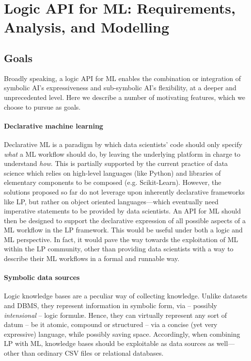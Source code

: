 \documentclass[12pt,a4paper,openright,twoside]{book}
\begin{document}
\section{Logic API for ML: Requirements, Analysis, and Modelling}
\label{sec:requirements}

\subsection{Goals}\label{ssec:goals}

Broadly speaking, a logic API for ML enables the combination or integration of symbolic AI's expressiveness and sub-symbolic AI's flexibility, at a deeper and unprecedented level.
%
Here we describe a number of motivating features, which we choose to pursue as goals.


\paragraph{Declarative machine learning}

Declarative ML is a paradigm by which data scientists' code should only specify \emph{what} a ML workflow should do, by leaving the underlying platform in charge to understand \emph{how}.
%
This is partially supported by the current practice of data science which relies on high-level languages (like Python) and libraries of elementary components to be composed (e.g. Scikit-Learn).
%
However, the solutions proposed so far do not leverage upon inherently declarative frameworks like LP, but rather on object oriented languages---which eventually need imperative statements to be provided by data scientists.
%
An API for ML should then be designed to support the declarative expression of all possible aspects of a ML workflow in the LP framework.
%
This would be useful under both a logic and ML perspective.
%
In fact, it would pave the way towards the exploitation of ML within the LP community, other than providing data scientists with a way to describe their ML workflows in a formal and runnable way.


\paragraph{Symbolic data sources}

Logic knowledge bases are a peculiar way of collecting knowledge.
%
Unlike datasets and DBMS, they represent information in symbolic form, via -- possibly \emph{intensional} -- logic formul\ae{}.
%
Hence, they can virtually represent any sort of datum -- be it atomic, compound or structured -- via a concise (yet very expressive) language, while possibly saving space.
%
Accordingly, when combining LP with ML, knowledge bases should be exploitable as data sources as well---other than ordinary CSV files or relational databases.
\end{document}
